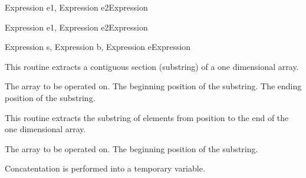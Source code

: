 \begin{functionality}
\fortranOp
\end{functionality}
	{Expression e1, Expression e2}{Expression}
\begin{functionality}
\fortranOp
\end{functionality}
\begin{functionality}
\fortranOp
\end{functionality}
	{Expression e1, Expression e2}{Expression}
\begin{functionality}
\fortranOp
\end{functionality}
	{Expression s, Expression b, Expression e}{Expression}
\begin{functionality}
This routine extracts a contiguous section (\ie substring) of a one
dimensional array.  
\begin{Parameters}
 The array to be operated on.
 The beginning position of the substring.
 The ending position of the substring.
\end{Parameters}
\end{functionality}
\begin{functionality}
This routine extracts the substring of elements from position 
to the end of the one dimensional array.
\begin{Parameters}
 The array to be operated on.
 The beginning position of the substring.
\end{Parameters}
\end{functionality}
\begin{functionality}
\fortranOp
Concatentation is performed into a temporary variable.
\end{functionality}


